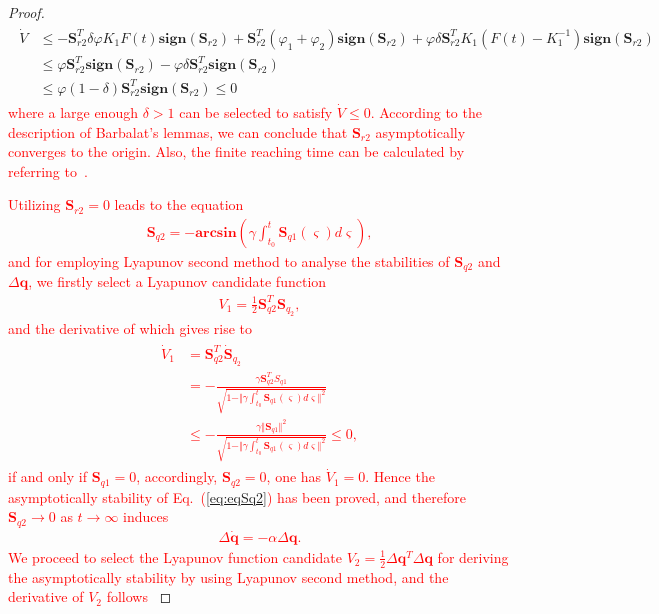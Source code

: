 \documentclass[3p]{elsarticle}
\theoremstyle{plain}
\theoremstyle{remark}
\begin{document}
\begin{proof}
{\begin{align}
\begin{split}\label{eq:V1_2}
\dot V&\le -\bm S_{r2}^T\delta\varphi  K_1F(t)\bm{sign}(\bm S_{r2})+\bm S_{r2}^T(\varphi_1+\varphi_2) \bm{sign}(\bm S_{r2})+\varphi\delta \bm S_{r2}^T K_1(F(t)-K_1^{-1})\bm{sign}(\bm S_{r2})\\
&\le \varphi \bm S_{r2}^T\bm{sign}(\bm S_{r2})-\varphi\delta \bm S_{r2}^T \bm{sign}(\bm S_{r2})\\
&\le\varphi(1-\delta)\bm S_{r2}^T\bm{sign}(\bm S_{r2})\le 0
\end{split}
\end{align}}
\textcolor{red}{
where a large enough $\delta>1$ can be selected to satisfy $\dot V \le 0$. According to the description of Barbalat's lemmas, we can conclude  that $\bm S_{r2}$ asymptotically converges to the origin. Also, the finite reaching time can be calculated by referring to~\cite{Ma201667}.}\par
\textcolor{red}{Utilizing $\bm S_{r2}=0$ leads to the equation
\begin{align}
\bm S_{q2}=-\bm{arcsin}(\gamma\int^t_{t_0}\bm S_{q1}(\varsigma) d\varsigma),\label{eq:eqSq2}
\end{align}
and for employing Lyapunov second method to analyse the stabilities of $\bm S_{q2}$ and $\Delta\bm q$, we firstly select a Lyapunov candidate function
\begin{align}
V_1 = \frac{1}{2}\bm S_{q2}^T\bm S_{q_2},
\end{align}
and the derivative of which gives rise to
\begin{align}
\begin{split}
\dot V_1 &= \bm S_{q2}^T\dot {\bm S}_{q_2}\\
&=-\frac{\gamma \bm S_{q2}^TS_{q1}}{\sqrt{1-\Vert\gamma\int^t_{t_0}\bm S_{q1}(\varsigma) d\varsigma\Vert^2}}\\
&\le -\frac{\gamma \Vert \bm S_{q1}\Vert^2}{\sqrt{1-\Vert\gamma\int^t_{t_0}\bm S_{q1}(\varsigma) d\varsigma\Vert^2}}\le 0,
\end{split}
\end{align}
if and only if $\bm S_{q1} = 0$, accordingly, $\bm S_{q2} = 0$, one has $\dot V_1=0$. Hence the asymptotically stability of Eq.~(\ref{eq:eqSq2}) has been proved, and therefore $\bm S_{q2}\rightarrow 0$ as $t\rightarrow \infty$ induces
\begin{align}
\Delta \dot {\bm q}=-\alpha \Delta \bm q.
\end{align}
We proceed to select the Lyapunov function candidate $V_2=\frac{1}{2}\Delta \bm q^T\Delta\bm q$ for deriving the asymptotically stability by using Lyapunov second method, and the derivative of $V_2$ follows
}
\end{proof}
\end{document}
